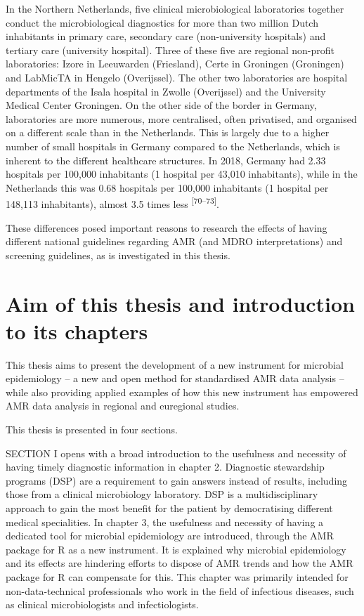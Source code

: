 \documentclass[
]{book}
\begin{document}
In the Northern Netherlands, five clinical microbiological laboratories together conduct the microbiological diagnostics for more than two million Dutch inhabitants in primary care, secondary care (non-university hospitals) and tertiary care (university hospital). Three of these five are regional non-profit laboratories: Izore in Leeuwarden (Friesland), Certe in Groningen (Groningen) and LabMicTA in Hengelo (Overijssel). The other two laboratories are hospital departments of the Isala hospital in Zwolle (Overijssel) and the University Medical Center Groningen. On the other side of the border in Germany, laboratories are more numerous, more centralised, often privatised, and organised on a different scale than in the Netherlands. This is largely due to a higher number of small hospitals in Germany compared to the Netherlands, which is inherent to the different healthcare structures. In 2018, Germany had 2.33 hospitals per 100,000 inhabitants (1 hospital per 43,010 inhabitants), while in the Netherlands this was 0.68 hospitals per 100,000 inhabitants (1 hospital per 148,113 inhabitants), almost 3.5 times less \textsuperscript{{[}70--73{]}}.

These differences posed important reasons to research the effects of having different national guidelines regarding AMR (and MDRO interpretations) and screening guidelines, as is investigated in this thesis.

\hypertarget{aim-of-this-thesis-and-introduction-to-its-chapters}{%
\section{Aim of this thesis and introduction to its chapters}\label{aim-of-this-thesis-and-introduction-to-its-chapters}}

This thesis aims to present the development of a new instrument for microbial epidemiology -- a new and open method for standardised AMR data analysis -- while also providing applied examples of how this new instrument has empowered AMR data analysis in regional and euregional studies.

This thesis is presented in four sections.

SECTION I opens with a broad introduction to the usefulness and necessity of having timely diagnostic information in chapter 2. Diagnostic stewardship programs (DSP) are a requirement to gain answers instead of results, including those from a clinical microbiology laboratory. DSP is a multidisciplinary approach to gain the most benefit for the patient by democratising different medical specialities. In chapter 3, the usefulness and necessity of having a dedicated tool for microbial epidemiology are introduced, through the AMR package for R as a new instrument. It is explained why microbial epidemiology and its effects are hindering efforts to dispose of AMR trends and how the AMR package for R can compensate for this. This chapter was primarily intended for non-data-technical professionals who work in the field of infectious diseases, such as clinical microbiologists and infectiologists.
\end{document}
